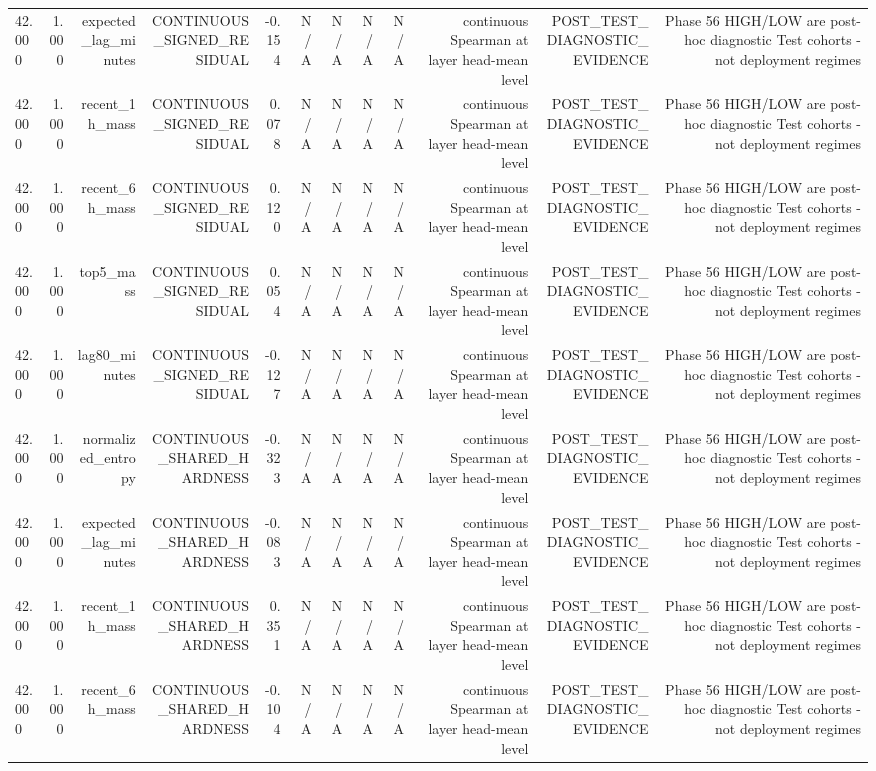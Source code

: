 \begin{table}[h!]
\begin{tabular}{lrrrrrrrrrrr}
42.000 & 1.000 & expected\_lag\_minutes & CONTINUOUS\_SIGNED\_RESIDUAL & -0.154 & N/A & N/A & N/A & N/A & continuous Spearman at layer head-mean level & POST\_TEST\_DIAGNOSTIC\_EVIDENCE & Phase 56 HIGH/LOW are post-hoc diagnostic Test cohorts - not deployment regimes \\
42.000 & 1.000 & recent\_1h\_mass & CONTINUOUS\_SIGNED\_RESIDUAL & 0.078 & N/A & N/A & N/A & N/A & continuous Spearman at layer head-mean level & POST\_TEST\_DIAGNOSTIC\_EVIDENCE & Phase 56 HIGH/LOW are post-hoc diagnostic Test cohorts - not deployment regimes \\
42.000 & 1.000 & recent\_6h\_mass & CONTINUOUS\_SIGNED\_RESIDUAL & 0.120 & N/A & N/A & N/A & N/A & continuous Spearman at layer head-mean level & POST\_TEST\_DIAGNOSTIC\_EVIDENCE & Phase 56 HIGH/LOW are post-hoc diagnostic Test cohorts - not deployment regimes \\
42.000 & 1.000 & top5\_mass & CONTINUOUS\_SIGNED\_RESIDUAL & 0.054 & N/A & N/A & N/A & N/A & continuous Spearman at layer head-mean level & POST\_TEST\_DIAGNOSTIC\_EVIDENCE & Phase 56 HIGH/LOW are post-hoc diagnostic Test cohorts - not deployment regimes \\
42.000 & 1.000 & lag80\_minutes & CONTINUOUS\_SIGNED\_RESIDUAL & -0.127 & N/A & N/A & N/A & N/A & continuous Spearman at layer head-mean level & POST\_TEST\_DIAGNOSTIC\_EVIDENCE & Phase 56 HIGH/LOW are post-hoc diagnostic Test cohorts - not deployment regimes \\
42.000 & 1.000 & normalized\_entropy & CONTINUOUS\_SHARED\_HARDNESS & -0.323 & N/A & N/A & N/A & N/A & continuous Spearman at layer head-mean level & POST\_TEST\_DIAGNOSTIC\_EVIDENCE & Phase 56 HIGH/LOW are post-hoc diagnostic Test cohorts - not deployment regimes \\
42.000 & 1.000 & expected\_lag\_minutes & CONTINUOUS\_SHARED\_HARDNESS & -0.083 & N/A & N/A & N/A & N/A & continuous Spearman at layer head-mean level & POST\_TEST\_DIAGNOSTIC\_EVIDENCE & Phase 56 HIGH/LOW are post-hoc diagnostic Test cohorts - not deployment regimes \\
42.000 & 1.000 & recent\_1h\_mass & CONTINUOUS\_SHARED\_HARDNESS & 0.351 & N/A & N/A & N/A & N/A & continuous Spearman at layer head-mean level & POST\_TEST\_DIAGNOSTIC\_EVIDENCE & Phase 56 HIGH/LOW are post-hoc diagnostic Test cohorts - not deployment regimes \\
42.000 & 1.000 & recent\_6h\_mass & CONTINUOUS\_SHARED\_HARDNESS & -0.104 & N/A & N/A & N/A & N/A & continuous Spearman at layer head-mean level & POST\_TEST\_DIAGNOSTIC\_EVIDENCE & Phase 56 HIGH/LOW are post-hoc diagnostic Test cohorts - not deployment regimes \\

\end{tabular}
\end{table}

